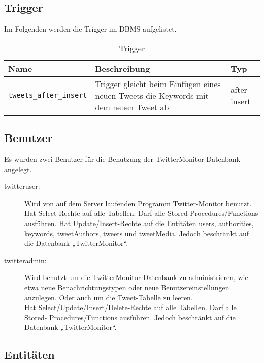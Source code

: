 \subsection{Trigger}

Im Folgenden werden die Trigger im DBMS aufgelistet.
\begin{table}[!ht]
\caption{Trigger}
  \begin{tabular}{p{3.6cm}p{7.6cm}p{2.6cm}}
    \toprule 
    \textbf{Name}  & \textbf{Beschreibung} & \textbf{Typ} \\
    \hline 
    \texttt{tweets\_after\_insert} & Trigger gleicht beim Einfügen eines neuen Tweets die Keywords mit dem neuen Tweet ab & after insert  \\
	\bottomrule
  \end{tabular}
\end{table}

\subsection{Benutzer}

Es wurden zwei Benutzer für die Benutzung der TwitterMonitor-Datenbank angelegt.  
\begin{description}
	\item [twitteruser: ] Wird von auf dem Server laufenden Programm Twitter-Monitor benutzt. Hat Select-Rechte auf alle Tabellen. Darf alle Stored-Procedures/Functions ausführen. Hat Update/Insert-Rechte auf die Entitäten users, authorities, keywords, tweetAuthors, tweets und tweetMedia. Jedoch beschränkt auf die Datenbank „TwitterMonitor“. 
	\item [twitteradmin: ] Wird benutzt um die TwitterMonitor-Datenbank zu administrieren, wie etwa neue Benachrichtungstypen oder neue Benutzereinstellungen anzulegen. Oder auch um die 
		Tweet-Tabelle zu leeren. \\
		Hat Select/Update/Insert/Delete-Rechte auf alle Tabellen. Darf alle Stored-
		Procedures/Functions ausführen. Jedoch beschränkt auf die Datenbank
		„TwitterMonitor“. 
\end{description}
 
\subsection{Entitäten}
 
